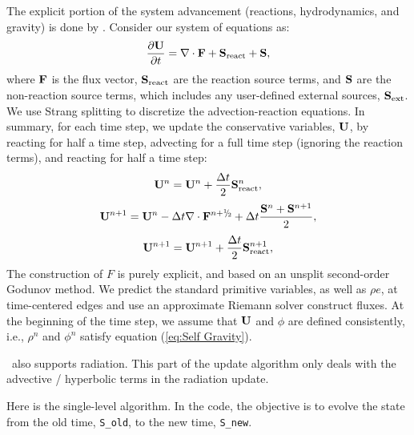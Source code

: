 The explicit portion of the system advancement (reactions,
hydrodynamics, and gravity) is done by .  
Consider our system of equations as:
\begin{equation}
\frac{\partial{\bf U}}{\partial t} = \nabla\cdot{\bf F} + {\bf S}_{\rm react} + {\bf S},
\end{equation}
where ${\bf F}$ is the flux vector, ${\bf S}_{\rm react}$ are the reaction
source terms, and ${\bf S}$ are the non-reaction source terms, which
includes any user-defined external sources, ${\bf S}_{\rm ext}$.  We use
Strang splitting to discretize the advection-reaction equations.  In
summary, for each time step, we update the conservative variables,
${\bf U}$, by reacting for half a time step, advecting for a full time
step (ignoring the reaction terms), and reacting for half a time step:
\begin{equation}
{\bf U}^n = {\bf U}^n + \frac{\Delta t}{2}{\bf S}_{\rm react}^n,
\end{equation}
\begin{equation}
\Ub^{n+1} = \Ub^n - \Delta t \nabla \cdot\Fb^\nph + \dt\frac{\Sb^n + \Sb^{n+1}}{2},
\end{equation}
\begin{equation}
{\bf U}^{n+1} = {\bf U}^{n+1} + \frac{\Delta t}{2}{\bf S}_{\rm react}^{n+1},
\end{equation}
The construction of $F$ is purely explicit, and based on an unsplit
second-order Godunov method.  We predict the standard primitive
variables, as well as $\rho e$, at time-centered edges and use an
approximate Riemann solver construct fluxes.  At the beginning of the
time step, we assume that ${\bf U}$ and $\phi$ are defined consistently,
i.e., $\rho^n$ and $\phi^n$ satisfy equation (\ref{eq:Self
  Gravity}).

\castro\ also supports radiation.  This part of the update algorithm
only deals with the advective / hyperbolic terms in the radiation update.

Here is the single-level algorithm.  In the code, the objective is to
evolve the state from the old time, {\tt S\_old}, to the new time,
{\tt S\_new}.  

